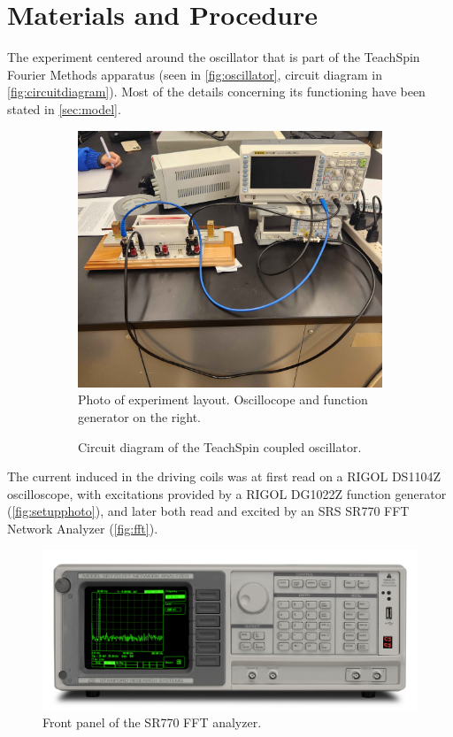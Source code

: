 \documentclass{article}
\begin{document}
\section{Materials and Procedure}
The experiment centered around the oscillator that is part of the TeachSpin Fourier Methods apparatus (seen in \autoref{fig:oscillator}, circuit diagram in \autoref{fig:circuitdiagram}). Most of the details concerning its functioning have been stated in \autoref*{sec:model}.

\begin{figure}
  \centering
  \begin{subfigure}{.45\textwidth}
    \centering
    \includegraphics[width=.8\linewidth]{setup.jpg}
    \caption{Photo of experiment layout. Oscillocope and function generator on the right.}
    \label{fig:setupphoto}
  \end{subfigure}
  \begin{subfigure}{.45\textwidth}
    \centering
    \def\svgwidth{\linewidth}
    
    \caption{Circuit diagram of the TeachSpin coupled oscillator.}
    \label{fig:circuitdiagram}
  \end{subfigure}
  \caption{}
  \label{setup}
\end{figure}

The current induced in the driving coils was at first read on a RIGOL DS1104Z oscilloscope, with excitations provided by a RIGOL DG1022Z function generator (\autoref{fig:setupphoto}), and later both read and excited by an SRS SR770 FFT Network Analyzer (\autoref{fig:fft}).

\begin{figure}
  \centering
  \includegraphics[width=\linewidth]{SR770_FPlg.jpg}
  \caption{Front panel of the SR770 FFT analyzer.}
  \label{fig:fft}
\end{figure}
\end{document}

